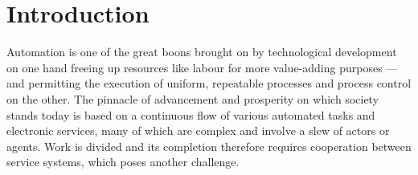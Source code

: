 \documentclass[12pt,a4paper,oneside,pdftex]{report}
\begin{document}


\label{pages-prelude}
\cleardoublepage

\startfirstchapter

\pagestyle{headings}


% 
\chapter{Introduction}
\label{chapter:intro}

Automation is one of the great boons brought on by technological development on one hand freeing up resources like labour for more value-adding purposes --- and permitting the execution of uniform, repeatable processes and process control on the other. The pinnacle of advancement and prosperity on which society stands today is based on a continuous flow of various automated tasks and electronic services, many of which are complex and involve a slew of actors or agents. Work is divided and its completion therefore requires cooperation between service systems, which poses another challenge.
\end{document}
